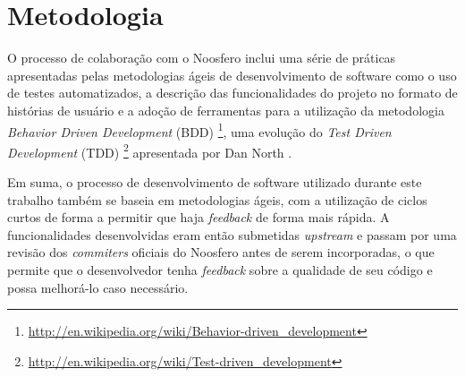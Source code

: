 \section{Metodologia}
\label{sec:metodologia}

O processo de colaboração com o Noosfero inclui uma série de práticas apresentadas
pelas metodologias ágeis de desenvolvimento de software como o uso de testes
automatizados, a descrição das funcionalidades do projeto no formato de
histórias de usuário e a adoção de ferramentas para a utilização da metodologia
\textit{Behavior Driven Development} (BDD)%
\footnote{\url{http://en.wikipedia.org/wiki/Behavior-driven_development}},
uma evolução do \textit{Test Driven Development} (TDD)%
\footnote{\url{http://en.wikipedia.org/wiki/Test-driven_development}}
apresentada por Dan North \cite{north2006}.

Em suma, o processo de desenvolvimento de software utilizado durante este trabalho
também se baseia em metodologias ágeis, com a utilização de ciclos curtos de
forma a permitir que haja \textit{feedback} de forma mais rápida. A funcionalidades
desenvolvidas eram então submetidas \textit{upstream} e passam por uma revisão dos
\textit{commiters} oficiais do Noosfero antes de serem incorporadas, o que permite
que o desenvolvedor tenha \textit{feedback} sobre a qualidade de seu código e possa
melhorá-lo caso necessário.
